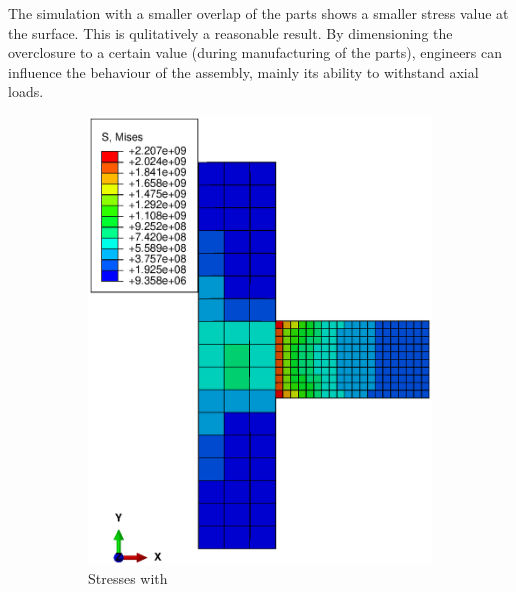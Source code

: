 \documentclass[12pt]{article}
\begin{document}
The simulation with a smaller overlap of the parts shows a smaller stress value at the surface.
This is qulitatively a reasonable result. By dimensioning the overclosure to a certain
value (during manufacturing of the parts), engineers can influence the behaviour of the 
assembly, mainly its ability to withstand axial loads. 



\begin{figure}[!htb]
  \centering
  \begin{subfigure}{.5\textwidth}
    \centering
    \includegraphics[width=0.95\linewidth]{pics/stress}
    \caption{Stresses with }
  \end{subfigure}%
  \begin{subfigure}{.5\textwidth}
    \centering

\end{subfigure}
\end{figure}
\end{document}
